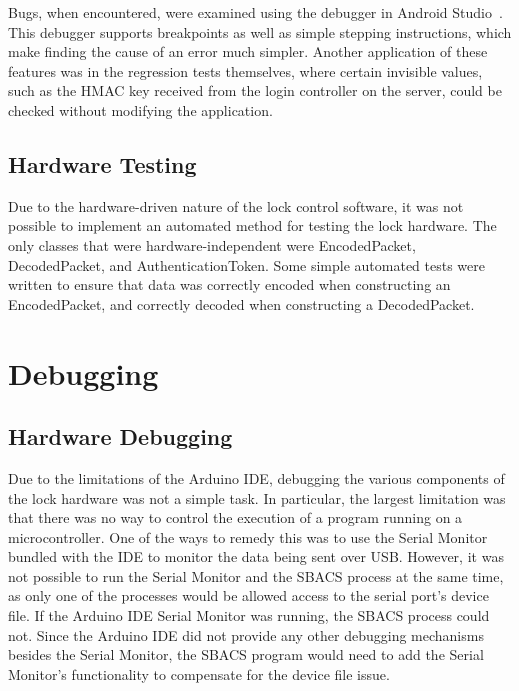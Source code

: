 \documentclass[12pt]{report}
\let\Oldsection\section
\renewcommand{\section}{\FloatBarrier\Oldsection}
\let\Oldsubsection\subsection
\renewcommand{\subsection}{\FloatBarrier\Oldsubsection}
\begin{document}
Bugs, when encountered, were examined using the debugger in Android Studio~\autocite{ANDROIDSTUDIO}. This debugger
supports breakpoints as well as simple stepping instructions, which make finding the cause of an error much simpler.
Another application of these features was in the regression tests themselves, where certain invisible values, such as
the HMAC key received from the login controller on the server, could be checked without modifying the application.

\subsection{Hardware Testing} \label{hardware-testing}

Due to the hardware-driven nature of the lock control software, it was not possible to implement an automated method 
for testing the lock hardware. The only classes that were hardware-independent were EncodedPacket, DecodedPacket, and 
AuthenticationToken. Some simple automated tests were written to ensure that data was correctly encoded when 
constructing an EncodedPacket, and correctly decoded when constructing a DecodedPacket.

\section{Debugging} \label{sec:debugging}

\subsection{Hardware Debugging}

Due to the limitations of the Arduino IDE, debugging the various components of the lock hardware was not a simple task. 
In particular, the largest limitation was that there was no way to control the execution of a program running on a 
microcontroller. One of the ways to remedy this was to use the Serial Monitor bundled with the IDE to monitor the data 
being sent over USB. However, it was not possible to run the Serial Monitor and the SBACS process at the same time, as 
only one of the processes would be allowed access to the serial port's device file. If the Arduino IDE Serial Monitor 
was running, the SBACS process could not. Since the Arduino IDE did not provide any other debugging mechanisms besides 
the Serial Monitor, the SBACS program would need to add the Serial Monitor's functionality to compensate for the device 
file issue.
\end{document}
